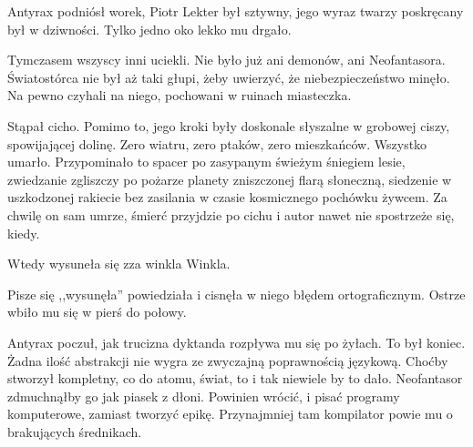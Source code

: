\divider{}

Antyrax podniósł worek, Piotr Lekter był sztywny, jego wyraz twarzy poskręcany był w dziwności. Tylko jedno oko lekko mu drgało.

Tymczasem wszyscy inni uciekli. Nie było już ani demonów, ani Neofantasora. Światostórca nie był aż taki głupi, żeby uwierzyć, że niebezpieczeństwo minęło. 
Na pewno czyhali na niego, pochowani w ruinach miasteczka.

Stąpał cicho. Pomimo to, jego kroki były doskonale słyszalne w grobowej ciszy, spowijającej dolinę.
Zero wiatru, zero ptaków, zero mieszkańców. Wszystko umarło. 
Przypominało to spacer po zasypanym świeżym śniegiem lesie, 
zwiedzanie zgliszczy po pożarze planety zniszczonej flarą słoneczną, 
siedzenie w uszkodzonej rakiecie bez zasilania w czasie kosmicznego pochówku żywcem.
Za chwilę on sam umrze, śmierć przyjdzie po cichu i autor nawet nie spostrzeże się, kiedy.

Wtedy wysuneła się zza winkla Winkla. 

\begin{dialogue}
\ds{} Pisze się ,,wysunęła'' \dm{} powiedziała i cisnęła w niego błędem ortograficznym. Ostrze wbiło mu się w pierś do połowy.
\end{dialogue}
Antyrax poczuł, jak trucizna dyktanda rozpływa mu się po żyłach. To był koniec. Żadna ilość abstrakcji nie wygra ze zwyczajną poprawnością językową.
Choćby stworzył kompletny, co do atomu, świat, to i tak niewiele by to dało. Neofantasor zdmuchnąłby go jak piasek z dłoni.
Powinien wrócić, i pisać programy komputerowe, zamiast tworzyć epikę. Przynajmniej tam kompilator powie mu o brakujących średnikach.

